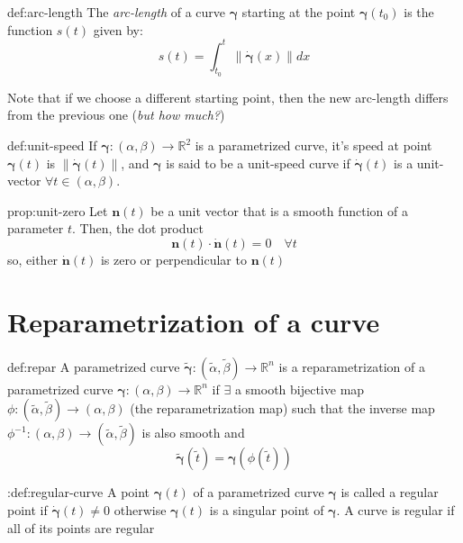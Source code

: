 \documentclass{notes}
\newcommand{\norm}[1]{\left\lVert #1 \right \rVert}
\begin{document}
\begin{definition}{def:arc-length}
	The \textit{arc-length} of a curve \(\bm{\gamma}\) starting at the point \(\bm{\gamma}(t_0)\) is the function \(s(t)\) given by:
	\[s(t) = \int_{t_0}^{t} \norm{\dot{\bm{\gamma}}(x)} dx\]
	
	Note that if we choose a different starting point, then the new arc-length differs from the previous one (\textit{but how much?})
\end{definition}

\begin{definition}{def:unit-speed}
	If \(\bm{\gamma}: (\alpha, \beta) \to \mathbb{R}^2\) is a parametrized curve, it's speed at point \(\mathbf{\bm{\gamma}}(t)\) is \(\norm{\dot{\bm{\gamma}}(t)}\), and \(\bm{\gamma}\) is said to be a unit-speed curve if \(\dot{\bm{\gamma}}(t)\) is a unit-vector \(\forall t\in (\alpha, \beta)\).
\end{definition}

\begin{proposition}{prop:unit-zero}
	Let \(\mathbf{n}(t)\) be a unit vector that is a smooth function of a parameter \(t\). Then, the dot product
	\[\mathbf{n}(t) \cdot \dot{\mathbf{n}}(t) = 0 \quad \forall t\]
	so, either \(\dot{\mathbf{n}}(t)\) is zero or perpendicular to \({\mathbf{n}}(t)\)

\end{proposition}

\section{Reparametrization of a curve}

\begin{definition}[Reparametrization]{def:repar}
A parametrized curve \(\tilde{\bm{\gamma}}: (\tilde{\alpha}, \tilde{\beta}) \to \mathbb{R}^n\) is a reparametrization of a parametrized curve \(\bm{\gamma}: (\alpha, \beta) \to \mathbb{R}^n\) if \(\exists\) a smooth bijective map \(\phi: (\tilde{\alpha}, \tilde{\beta}) \to (\alpha, \beta)\) (the reparametrization map) such that the inverse map \(\phi^{-1}: (\alpha, \beta) \to (\tilde{\alpha}, \tilde{\beta})\) is also smooth and
\[\tilde{\bm{\gamma}}(\tilde{t}) = \bm{\gamma}(\phi(\tilde{t}))\]
\end{definition}

\begin{definition}{:def:regular-curve}
	A point \(\bm{\gamma}(t)\) of a parametrized curve \(\bm{\gamma}\) is called a regular point if \(\dot{\bm{\gamma}}(t) \not = 0\)
	otherwise \(\bm{\gamma}(t)\) is a singular point of \(\bm{\gamma}\). A curve is regular if all of its points are regular
\end{definition}
\end{document}
